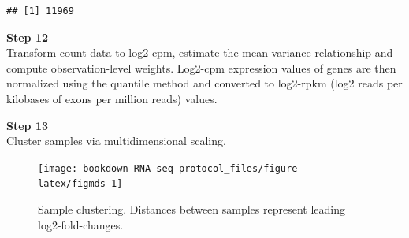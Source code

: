 \documentclass[]{book}
\newenvironment{Shaded}{\begin{snugshade}}{\end{snugshade}}
\newcommand{\DataTypeTok}[1]{\textcolor[rgb]{0.13,0.29,0.53}{#1}}
\newcommand{\DecValTok}[1]{\textcolor[rgb]{0.00,0.00,0.81}{#1}}
\newcommand{\FloatTok}[1]{\textcolor[rgb]{0.00,0.00,0.81}{#1}}
\newcommand{\KeywordTok}[1]{\textcolor[rgb]{0.13,0.29,0.53}{\textbf{#1}}}
\newcommand{\NormalTok}[1]{#1}
\newcommand{\OperatorTok}[1]{\textcolor[rgb]{0.81,0.36,0.00}{\textbf{#1}}}
\newcommand{\StringTok}[1]{\textcolor[rgb]{0.31,0.60,0.02}{#1}}
\begin{document}
\begin{Shaded}
\end{Shaded}

\begin{verbatim}
## [1] 11969
\end{verbatim}

\textbf{Step 12}\\
Transform count data to log2-cpm, estimate the mean-variance relationship and compute observation-level weights. Log2-cpm expression values of genes are then normalized using the quantile method and converted to log2-rpkm (log2 reads per kilobases of exons per million reads) values.

\begin{Shaded}
\end{Shaded}

\textbf{Step 13}\\
Cluster samples via multidimensional scaling.

\begin{Shaded}
\end{Shaded}

\begin{figure}

{\centering \texttt{[image: bookdown-RNA-seq-protocol\_files/figure-latex/figmds-1]} 

}

\caption{Sample clustering. Distances between samples represent leading log2-fold-changes.}\label{fig:figmds}
\end{figure}
\end{document}
